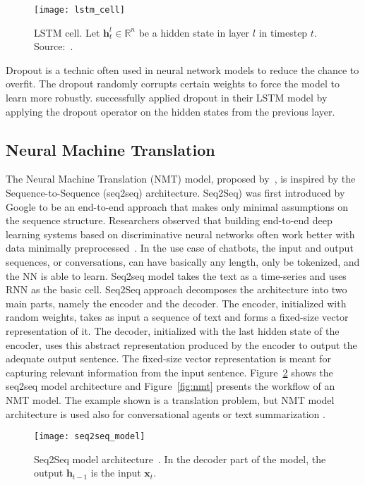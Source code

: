 \begin{figure}
    \centering
    \texttt{[image: lstm\_cell]}
    \decoRule
    \caption[LSTM cell]{LSTM cell. Let $\bm{h}^l_t \in \mathbb{R}^n$ be a hidden state in layer $l$ in timestep $t$. Source:~\citet{1409.2329}.}
    \label{fig:lstm-cell}
\end{figure}

Dropout \citep{srivastava2014dropout} is a technic often used in neural network models to reduce the chance to overfit. The dropout randomly corrupts certain weights to force the model to learn more robustly. \citet{1409.2329} successfully applied dropout in their LSTM model by applying the dropout operator on the hidden states from the previous layer.

\subsection{Neural Machine Translation}
The Neural Machine Translation (NMT) model, proposed by~\citet{nmt-phd}, is inspired by the Sequence-to-Sequence (seq2seq) architecture. Seq2Seq) was first introduced by Google \citep{1409.3215} to be an end-to-end approach that makes only minimal assumptions on the sequence structure.
Researchers observed that building end-to-end deep learning systems based on discriminative neural networks often work better with data minimally preprocessed~\citep{chen2015handbook}.
In the use case of chatbots, the input and output sequences, or conversations, can have basically any length, only be tokenized, and the NN is able to learn. Seq2seq model takes the text as a time-series and uses RNN as the basic cell. Seq2Seq approach decomposes the architecture into two main parts, namely the encoder and the decoder. The encoder, initialized with random weights, takes as input a sequence of text and forms a fixed-size vector representation of it.
The decoder, initialized with the last hidden state of the encoder, uses this abstract representation produced by the encoder to output the adequate output sentence. The fixed-size vector representation is meant for capturing relevant information from the input sentence.
Figure~\ref{fig:seq2seqmodel} shows the seq2seq model architecture and Figure~\ref{fig:nmt} presents the workflow of an NMT model. The example shown is a translation problem, but NMT model architecture is used also for conversational agents or text summarization \citep{tensorflow.nmt}.

\begin{figure}
    \centering
    \texttt{[image: seq2seq\_model]}
    \decoRule
    \caption[Seq2Seq model architecture]{Seq2Seq model architecture~\citep{1409.3215}. In the decoder part of the model, the output $\bm{h}_{t-1}$ is the input $\bm{x}_{t}$.}
    \label{fig:seq2seqmodel}
\end{figure}

